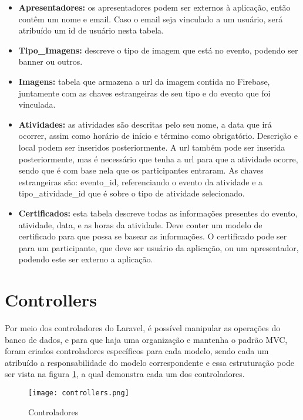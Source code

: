 \begin{itemize}
    \item \textbf{Apresentadores:} os apresentadores podem ser externos à aplicação, então contêm um nome e email. Caso o email seja vinculado a um usuário, será atribuído um id de usuário nesta tabela.
    
    \item \textbf{Tipo\_Imagens:} descreve o tipo de imagem que está no evento, podendo ser banner ou outros.
    
    \item \textbf{Imagens:} tabela que armazena a url da imagem contida no Firebase, juntamente com as chaves estrangeiras de seu tipo e do evento que foi vinculada.
    
    \item \textbf{Atividades:} as atividades são descritas pelo seu nome, a data que irá ocorrer, assim como horário de início e término como obrigatório. Descrição e local podem ser inseridos posteriormente. A url também pode ser inserida posteriormente, mas é necessário que tenha a url para que a atividade ocorre, sendo que é com base nela que os participantes entraram. As chaves estrangeiras são: evento\_id, referenciando o evento da atividade e a tipo\_atividade\_id que é sobre o tipo de atividade selecionado.
    
    \item \textbf{Certificados:} esta tabela descreve todas as informações presentes do evento, atividade, data, e as horas da atividade. Deve conter um modelo de certificado para que possa se basear as informações. O certificado pode ser para um participante, que deve ser usuário da aplicação, ou um apresentador, podendo este ser externo a aplicação.
    
\end{itemize}

\section{Controllers}
Por meio dos controladores do Laravel, é possível manipular as operações do banco de dados, e para que haja uma organização e mantenha o padrão MVC, foram criados controladores específicos para cada modelo, sendo cada um atribuído a responsabilidade do modelo correspondente e essa estruturação pode ser vista na figura \ref{controllers}, a qual demonstra cada um dos controladores.
\begin{figure}[H]
    \caption{\label{controllers}Controladores}
    \vspace{5pt}
    \centering
    \texttt{[image: controllers.png]}
    \vspace{5pt}
\end{figure}

